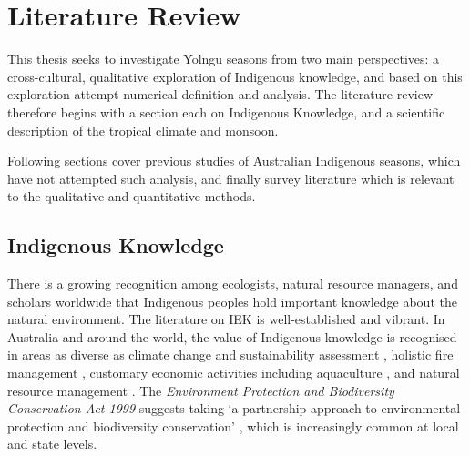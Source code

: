 \chapter{Literature Review}
\label{ch:lit-review}


This thesis seeks to investigate Yolngu seasons from two main perspectives:
a cross-cultural, qualitative exploration of Indigenous knowledge, and
based on this exploration attempt numerical definition and analysis.
The literature review therefore begins with a section each on Indigenous
Knowledge, and a scientific description of the tropical climate and monsoon.

Following sections cover previous studies of Australian Indigenous seasons,
which have not attempted such analysis, and finally survey literature which is
relevant to the qualitative and quantitative methods.



\section{Indigenous Knowledge}
\label{sec:lit-iek}


There is a growing recognition among ecologists, natural resource managers, and
scholars worldwide that Indigenous peoples hold important knowledge about the
natural environment. The literature on IEK is well-established and vibrant.  In
Australia and around the world, the value of Indigenous knowledge is recognised
in areas as diverse as climate change and sustainability assessment
\citep[eg.][]{cochran2015}, holistic fire management \citep[eg.][]{clarke2009,price2012},
customary economic activities including aquaculture \citep{woodward2012a}, and
natural resource management \citep[eg.][]{prober2011}.  The \textit{Environment
Protection and Biodiversity Conservation Act 1999} suggests taking `a
partnership approach to environmental protection and biodiversity conservation'
\citep{ens2012}, which is increasingly common at local and state levels.




